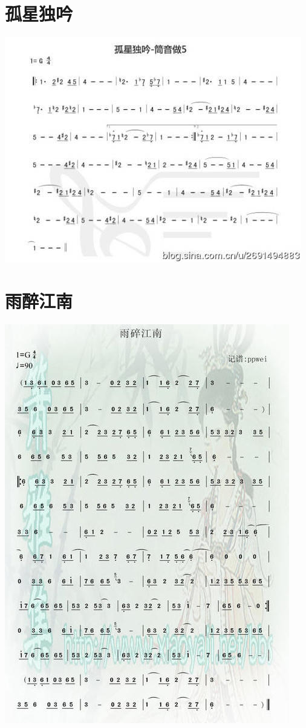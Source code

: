 \documentclass[cn,pad,chinese,chinesefont=nofont]{elegantbook}
\begin{document}
    
\section{孤星独吟}
    \includegraphics[width=\textwidth]{dongxiao/孤星独吟.jpg}
\section{雨醉江南}
    \includegraphics[width=\textwidth]{dongxiao/雨醉江南.jpg}
\end{document}
